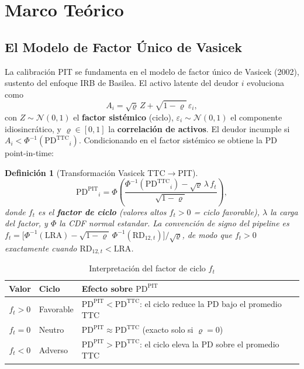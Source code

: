 \documentclass[12pt, a4paper]{article}
\newcommand{\PDTTC}{\ensuremath{\mathrm{PD}^{\mathrm{TTC}}}}
\newcommand{\PDPIT}{\ensuremath{\mathrm{PD}^{\mathrm{PIT}}}}
\newcommand{\RD}{\ensuremath{\mathrm{RD}}}
\newcommand{\LRA}{\ensuremath{\mathrm{LRA}}}
\renewcommand{\rho}{\ensuremath{\varrho}}
\newcommand{\ft}{\ensuremath{f_t}}
\newtheorem{definicion}{Definición}[section]
\begin{document}
\newpage

\section{Marco Teórico}
\label{sec:marco}

\subsection{El Modelo de Factor Único de Vasicek}
La calibración PIT se fundamenta en el modelo de factor único de Vasicek (2002), sustento del
enfoque IRB de Basilea. El activo latente del deudor $i$ evoluciona como
\begin{equation}
  A_i = \sqrt{\rho}\,Z + \sqrt{1-\rho}\,\varepsilon_i,
  \label{eq:activo}
\end{equation}
con $Z\sim\mathcal{N}(0,1)$ el \textbf{factor sistémico} (ciclo), $\varepsilon_i\sim\mathcal{N}(0,1)$
el componente idiosincrático, y $\rho\in[0,1]$ la \textbf{correlación de activos}. El deudor
incumple si $A_i<\Phi^{-1}(\PDTTC_i)$. Condicionando en el factor sistémico se obtiene la PD
point-in-time:

\begin{definicion}[Transformación Vasicek TTC$\to$PIT]
\label{def:vasicek}
\begin{equation}
  \PDPIT_i = \Phi\!\left(\frac{\Phi^{-1}(\PDTTC_i) - \sqrt{\rho}\,\lambda\,\ft}{\sqrt{1-\rho}}\right),
  \label{eq:pit}
\end{equation}
donde $\ft$ es el \textbf{factor de ciclo} (valores altos $\ft>0$ = ciclo favorable),
$\lambda$ la carga del factor, y $\Phi$ la CDF normal estandar. La convención de signo del
pipeline es $\ft=\big[\Phi^{-1}(\LRA)-\sqrt{1-\rho}\,\Phi^{-1}(\RD_{12,t})\big]/\sqrt{\rho}$, de
modo que $\ft>0$ exactamente cuando $\RD_{12,t}<\LRA$.
\end{definicion}

\begin{table}[H]
\centering
\small
\caption{Interpretación del factor de ciclo $\ft$}
\begin{tabular}{clp{7.5cm}}
\toprule
\textbf{Valor} & \textbf{Ciclo} & \textbf{Efecto sobre $\PDPIT$} \\
\midrule
$\ft>0$ & Favorable & $\PDPIT<\PDTTC$: el ciclo reduce la PD bajo el promedio TTC \\
$\ft=0$ & Neutro    & $\PDPIT\approx\PDTTC$ (exacto solo si $\rho=0$) \\
$\ft<0$ & Adverso   & $\PDPIT>\PDTTC$: el ciclo eleva la PD sobre el promedio TTC \\
\bottomrule
\end{tabular}
\end{table}
\end{document}
